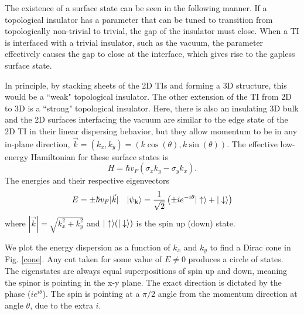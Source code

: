 The existence of a surface state can be seen in the following manner. If a topological insulator has a parameter that can be tuned to transition from topologically non-trivial to trivial, the gap of the insulator must close. When a TI is interfaced with a trivial insulator, such as the vacuum, the parameter effectively causes the gap to close at the interface, which gives rise to the gapless surface state.

In principle, by stacking sheets of the 2D TIs and forming a 3D structure, this would be a ``weak" topological insulator. The other extension of the TI from 2D to 3D  is a ``strong" topological insulator. Here, there is also an insulating 3D bulk and the 2D surfaces interfacing the vacuum are similar to the edge state of the 2D TI in their linear dispersing behavior, but they allow momentum to be in any in-plane direction, $\vec{k}=(k_x,k_y)=(k \cos(\theta),k \sin(\theta))$. The effective low-energy Hamiltonian for these surface states is
\begin{equation}
H=\hbar v_F (\sigma_x k_y - \sigma_y k_x).
\end{equation}
The energies and their respective eigenvectors
\begin{equation}
E=\pm \hbar v_F |\vec{k}|\quad
\vert \psi_{\bf{k}} \rangle=\frac{1}{\sqrt{2}}\left(\pm i e^{-i \theta}\vert \uparrow \rangle+\vert \downarrow \rangle\right)
\end{equation}
 where $|\vec{k}|=\sqrt{k_x^2+k_y^2}$ and $\vert \uparrow \rangle(\vert \downarrow \rangle)$ is the spin up (down) state.
 
 We plot the energy dispersion as a function of $k_x$ and $k_y$ to find a Dirac cone in Fig. \ref{cone}. Any cut taken for some value of $E\neq0$ produces a circle of states. The eigenstates are always equal superpositions of spin up and down, meaning the spinor is pointing in the x-y plane. The exact direction is dictated by the phase ($ie^{i \theta}$). The spin is pointing at a $\pi/2$ angle from the momentum direction at angle $\theta$, due to the extra $i$.


